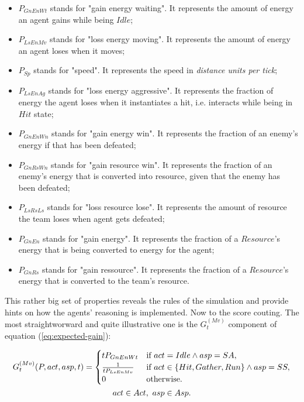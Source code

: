 \begin{itemize}
    \item $P_{GnEnWt}$ stands for "gain energy waiting". It represents the amount of energy an agent gains while being $Idle$;
    \item $P_{LsEnMv}$ stands for "loss energy moving". It represents the amount of energy an agent loses when it moves;
    \item $P_{Sp}$ stands for "speed". It represents the speed in \textit{distance units per tick};
    \item $P_{LsEnAg}$ stands for "loss energy aggressive". It represents the fraction of energy the agent loses when it instantiates a hit, i.e. interacts while being in $Hit$ state;
    \item $P_{GnEnWn}$ stands for "gain energy win". It represents the fraction of an enemy's energy if that has been defeated;
    \item $P_{GnRsWn}$ stands for "gain resource win". It represents the fraction of an enemy's energy that is converted into resource, given that the enemy has been defeated;
    \item $P_{LsRsLs}$ stands for "loss resource lose". It represents the amount of resource the team loses when agent gets defeated;
    \item $P_{GnEn}$ stands for "gain energy". It represents the fraction of a $Resource$'s energy that is being converted to energy for the agent;
    \item $P_{GnRs}$ stands for "gain ressource". It represents the fraction of a $Resource$'s energy that is converted to the team's resource.
\end{itemize}

This rather big set of properties reveals the rules of the simulation and provide hints on how the agents' reasoning is
implemented. Now to the score couting. The most straightworward and quite illustrative one is the $G_t^{(Mv)}$ component
of equation (\ref{eq:expected-gain}):

\begin{equation*}
    \begin{gathered}
        $$
        G_t^{(Mv)}(P,act,asp,t) =
        \begin{cases}
            tP_{GnEnWt} & \mbox{if } act=Idle \wedge asp = SA,\\
            \frac {1} {tP_{LsEnMv}} & \mbox{if } act \in \{Hit, Gather, Run\} \wedge asp = SS,\\
            0 & \mbox{otherwise}.
        \end{cases} \\
        act \in Act, \  asp \in Asp.
        $$
    \end{gathered}
\end{equation*}

